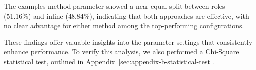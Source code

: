The examples method parameter showed a near-equal split between roles (51.16\%) and inline (48.84\%), indicating that both approaches are effective, with no clear advantage for either method among the top-performing configurations.


These findings offer valuable insights into the parameter settings that consistently enhance performance. To verify this analysis, we also performed a Chi-Square statistical test, outlined in Appendix~\ref{sec:appendix-b-statistical-test}.



